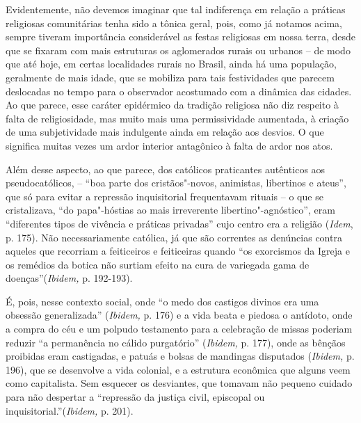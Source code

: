{Evidentemente, não devemos imaginar que tal indiferença em relação a
práticas religiosas comunitárias tenha sido a tônica geral, pois, como
já notamos acima, sempre tiveram importância considerável as festas
religiosas em nossa terra, desde que se fixaram com mais estruturas os
aglomerados rurais ou urbanos -- de modo que até hoje, em certas
localidades rurais no Brasil, ainda há uma população, geralmente de mais
idade, que se mobiliza para tais festividades que parecem deslocadas no
tempo para o observador acostumado com a dinâmica das cidades. Ao que
parece, esse caráter epidérmico da tradição religiosa não diz respeito à
falta de religiosidade, mas muito mais uma permissividade aumentada, à
criação de uma subjetividade mais indulgente ainda em relação aos
desvios. O que significa muitas vezes um ardor interior antagônico à
falta de ardor nos atos.

Além desse aspecto, ao que parece, dos católicos praticantes autênticos
aos pseudocatólicos, -- ``boa parte dos cristãos"-novos, animistas,
libertinos e ateus'', que só para evitar a repressão inquisitorial
frequentavam rituais -- o que se cristalizava, ``do papa"-hóstias ao mais
irreverente libertino"-agnóstico'', eram ``diferentes tipos de vivência e
práticas privadas'' cujo centro era a religião (\emph{Idem}, p. 175).
Não necessariamente católica, já que são correntes as denúncias contra
aqueles que recorriam a feiticeiros e feiticeiras quando ``os exorcismos
da Igreja e os remédios da botica não surtiam efeito na cura de
variegada gama de doenças''(\emph{Ibidem,} p. 192-193).

É, pois, nesse contexto social, onde ``o medo dos castigos divinos era
uma obsessão generalizada'' (\emph{Ibidem,} p. 176) e a vida beata e
piedosa o antídoto, onde a compra do céu e um polpudo testamento para a
celebração de missas poderiam reduzir ``a permanência no cálido
purgatório'' (\emph{Ibidem,} p. 177), onde as bênçãos proibidas eram
castigadas, e patuás e bolsas de mandingas disputados (\emph{Ibidem,} p.
196), que se desenvolve a vida colonial, e a estrutura econômica que
alguns veem como capitalista. Sem esquecer os desviantes, que tomavam
não pequeno cuidado para não despertar a ``repressão da justiça civil,
episcopal ou inquisitorial.''(\emph{Ibidem,} p. 201).

}
